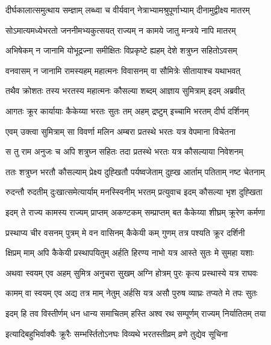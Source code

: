 
\twolineshloka
{दीर्घकालात्समुत्थाय सम्ज्ञाम् लब्ध्वा च वीर्यवान्}
{नेत्राभ्यामश्रुपूर्णाभ्याम् दीनामुद्वीक्ष्य मातरम्} %

\twolineshloka
{सोऽमात्यमध्येभरतो जननीमभ्यकुत्सयत्}
{राज्यम् न कामये जातु मन्त्रये नापि मातरम्} %

\twolineshloka
{अभिषेकम् न जानामि योभूद्रज्ना समीक्षितः}
{विप्रकृष्टे ह्यहम् देशे शत्रुघ्न सहितोऽवसम्} %

\twolineshloka
{वनवासम् न जानामि रामस्यहम् महात्मनः}
{विवासनम् वा सौमित्रेः सीतायाश्च यथाभवत्} %

\twolineshloka
{तथैव क्रोशतः तस्य भरतस्य महात्मनः}
{कौसल्या शब्दम् आज्ञाय सुमित्राम् इदम् अब्रवीत्} %

\twolineshloka
{आगतः क्रूर कार्यायाः कैकेय्या भरतः सुतः}
{तम् अहम् द्रष्टुम् इच्चामि भरतम् दीर्घ दर्शिनम्} %

\twolineshloka
{एवम् उक्त्वा सुमित्राम् सा विवर्णा मलिन अम्बरा}
{प्रतस्थे भरतः यत्र वेपमाना विचेतना} %

\twolineshloka
{स तु राम अनुजः च अपि शत्रुघ्न सहितः तदा}
{प्रतस्थे भरतः यत्र कौसल्याया निवेशनम्} %

\twolineshloka
{ततः शत्रुघ्न भरतौ कौसल्याम् प्रेक्ष्य दुह्खितौ}
{पर्यष्वजेताम् दुह्ख आर्ताम् पतिताम् नष्ट चेतनाम्} %

\twolineshloka
{रुदन्तौ रुदतीम् दुःखात्समेत्यार्याम् मनस्स्विनीम्}
{भरतम् प्रत्युवाच इदम् कौसल्या भृश दुह्खिता} %

\twolineshloka
{इदम् ते राज्य कामस्य राज्यम् प्राप्तम् अकण्टकम्}
{सम्प्राप्तम् बत कैकेय्या शीघ्रम् क्रूरेण कर्मणा} %

\twolineshloka
{प्रस्थाप्य चीर वसनम् पुत्रम् मे वन वासिनम्}
{कैकेयी कम् गुणम् तत्र पश्यति क्रूर दर्शिनी} %

\twolineshloka
{क्षिप्रम् माम् अपि कैकेयी प्रस्थापयितुम् अर्हति}
{हिरण्य नाभो यत्र आस्ते सुतः मे सुमहा यशाः} %

\twolineshloka
{अथवा स्वयम् एव अहम् सुमित्र अनुचरा सुखम्}
{अग्नि होत्रम् पुरः कृत्य प्रस्थास्ये यत्र राघवः} %

\twolineshloka
{कामम् वा स्वयम् एव अद्य तत्र माम् नेतुम् अर्हसि}
{यत्र असौ पुरुष व्याघ्रः तप्यते मे तपः सुतः} %

\twolineshloka
{इदम् हि तव विस्तीर्णम् धन धान्य समाचितम्}
{हस्ति अश्व रथ सम्पूर्णम् राज्यम् निर्यातितम् तया} %

\twolineshloka
{इत्यादिबहुभिर्वाक्यैः क्रूरैः सम्भर्स्तितोऽनघः}
{विव्यथे भरतस्तीव्रम् व्रणे तुद्येव सूचिना} %

